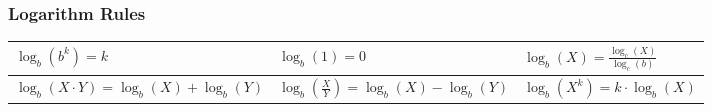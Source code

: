 \documentclass[twoside]{article}
\renewcommand{\arraystretch}{1.5} %
\begin{document}
\subsubsection*{Logarithm Rules}
\vspace{1em}
\sffamily
\bgroup
\def\arraystretch{2}
{\normalsize
\begin{center}
  \begin{tabular}{| >{\centering}m{5cm}| >{\centering}m{5cm}| >{\centering}m{5cm}|}
    \hline
    $\log_b(b^k) = k$
     &
    $\log_b(1) = 0$
     &
    $\log_b(X) = \frac{\log_c(X)}{\log_c(b)}$
    \tabularnewline \hline
    $\log_b(X \cdotp Y) = \log_b(X) + \log_b(Y)$
     &
    $\log_b(\frac{X}{Y}) = \log_b(X) - \log_b(Y)$
     &
    $\log_b(X^k) = k \cdotp \log_b(X)$
    \tabularnewline \hline
  \end{tabular}
\end{center}
}
\egroup
\vspace{1em}
\begin{multicols*}{2}

\end{multicols*}
\end{document}
